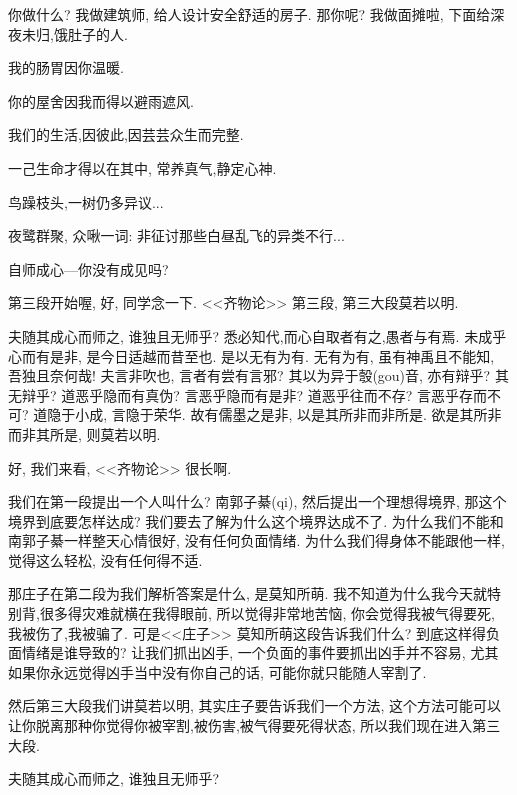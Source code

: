 \documentclass[11pt]{article}
\begin{document}
你做什么? 我做建筑师, 给人设计安全舒适的房子. 那你呢? 我做面摊啦, 下面给深夜未归,饿肚子的人.

\begin{center}
	我的肠胃因你温暖. 
	
	你的屋舍因我而得以避雨遮风.  
	
	我们的生活,因彼此,因芸芸众生而完整. 
	
	一己生命才得以在其中, 常养真气,静定心神. 
	
	鸟躁枝头,一树仍多异议...
	
	夜鹭群聚, 众啾一词: 非征讨那些白昼乱飞的异类不行...
\end{center}

{\Large {\color{purple} 自师成心---你没有成见吗?}}

第三段开始喔, 好, 同学念一下. <<齐物论>> 第三段, 第三大段莫若以明. 

{\color{blue} 夫随其成心而师之, 谁独且无师乎? 悉必知代,而心自取者有之,愚者与有焉. 未成乎心而有是非, 是今日适越而昔至也. 是以无有为有. 无有为有, 虽有神禹且不能知, 吾独且奈何哉! 夫言非吹也, 言者有尝有言邪? 其以为异于彀(gou)音, 亦有辩乎? 其无辩乎? 道恶乎隐而有真伪? 言恶乎隐而有是非? 道恶乎往而不存? 言恶乎存而不可? 道隐于小成, 言隐于荣华. 故有儒墨之是非, 以是其所非而非所是. 欲是其所非而非其所是, 则莫若以明.}

好, 我们来看, <<齐物论>> 很长啊. 

我们在第一段提出一个人叫什么? 南郭子綦(qi), 然后提出一个理想得境界, 那这个境界到底要怎样达成? 我们要去了解为什么这个境界达成不了. 为什么我们不能和南郭子綦一样整天心情很好, 没有任何负面情绪. 为什么我们得身体不能跟他一样, 觉得这么轻松, 没有任何得不适. 

那庄子在第二段为我们解析答案是什么, 是莫知所萌. 我不知道为什么我今天就特别背,很多得灾难就横在我得眼前, 所以觉得非常地苦恼, 你会觉得我被气得要死, 我被伤了,我被骗了. 可是<<庄子>> 莫知所萌这段告诉我们什么? 到底这样得负面情绪是谁导致的? 让我们抓出凶手, 一个负面的事件要抓出凶手并不容易, 尤其如果你永远觉得凶手当中没有你自己的话, 可能你就只能随人宰割了. 

然后第三大段我们讲莫若以明, 其实庄子要告诉我们一个方法, 这个方法可能可以让你脱离那种你觉得你被宰割,被伤害,被气得要死得状态, 所以我们现在进入第三大段.

\newpage 

{\begin{center}
		{\color{green} 夫随其成心而师之, 谁独且无师乎?}
\end{center}}

\vspace{-0.5cm}
\end{document}
